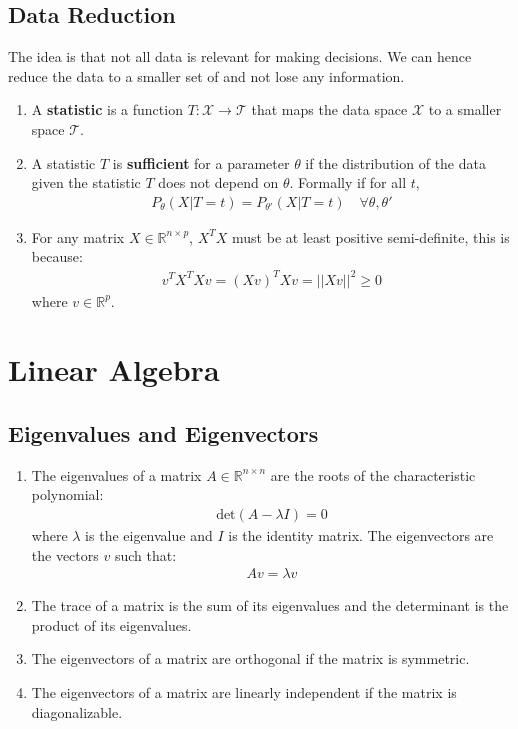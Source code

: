 \documentclass[letterpaper, 11pt]{article}
\let\mc\mathcal
\newcommand{\R}{\mathbb{R}}	%
\newcommand{\1}{\mathds{1}}	%
\theoremstyle{definition}
\begin{document}
\subsection{Data Reduction}
The idea is that not all data is relevant for making decisions. We can hence 
reduce the data to a smaller set of and not lose any information. 
\begin{enumerate}
    \item A \textbf{statistic} is a function $T : \mc{X} \to \mc{T}$ that maps the data space $\mc{X}$ to a smaller space $\mc{T}$.
    \item A statistic $T$ is \textbf{sufficient} for a parameter $\theta$ if the distribution of the data given the statistic $T$ does not depend on $\theta$. 
    Formally if for all $t$, 
    \begin{align}
        P_{\theta}(X | T = t) = P_{\theta'}(X | T = t) \quad \forall \theta, \theta'
    \end{align}
    \item For any matrix $X \in \R^{n \times p}$, $X^T X$ must be at least positive semi-definite, this is because:
    \begin{align}
        v^T X^T X v = (Xv)^T Xv = ||Xv||^2 \geq 0
    \end{align}
    where $v \in \R^p$.

\end{enumerate}

\section{Linear Algebra}

\subsection{Eigenvalues and Eigenvectors}
\begin{enumerate}
    \item The eigenvalues of a matrix $A \in \R^{n \times n}$ are the roots of the characteristic polynomial:
    \begin{align}
        \text{det}(A - \lambda I) = 0
    \end{align}
    where $\lambda$ is the eigenvalue and $I$ is the identity matrix. The eigenvectors are the vectors $v$ such that:
    \begin{align}
        A v = \lambda v
    \end{align}
    \item The trace of a matrix is the sum of its eigenvalues and the determinant is the product of its eigenvalues.
    \item The eigenvectors of a matrix are orthogonal if the matrix is symmetric.
    \item The eigenvectors of a matrix are linearly independent if the matrix is diagonalizable.
\end{enumerate}
\end{document}
